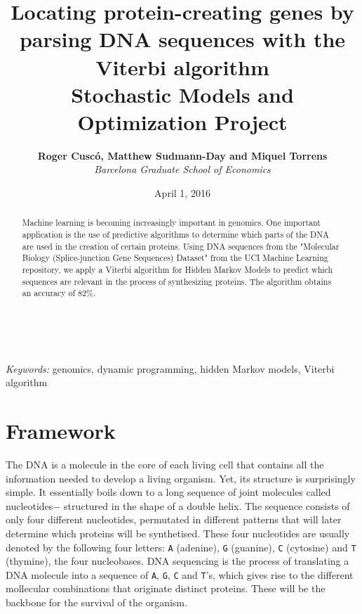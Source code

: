 \documentclass[a4paper, 11pt]{article} %
\title{\textbf{Locating protein-creating genes by parsing DNA sequences with the Viterbi algorithm}\\ %
\vspace{0.5cm}
{\Large Stochastic Models and Optimization Project}} %
\author{\textbf{Roger Cusc\'o, Matthew Sudmann-Day and Miquel Torrens} %
\vspace{0.1cm}
\\{{\large \textit{Barcelona Graduate School of Economics}}}} %
\date{\vspace{0.5cm} {\large April 1, 2016}} %
\makeatletter
\renewcommand{\maketitle}{ %
\begin{flushright} %
{\LARGE\@title} %

\vspace{50pt} %

{\large\@author} %
\\\@date %

\vspace{40pt} %
\end{flushright}
}
\makeatother
\begin{document}
\maketitle %



\begin{abstract}
Machine learning is becoming increasingly important in genomics. One important application is the use of predictive algorithms to determine which parts of the DNA are used in the creation of certain proteins. Using DNA sequences from the "Molecular Biology (Splice-junction Gene Sequences) Dataset" from the UCI Machine Learning repository, we apply a Viterbi algorithm for Hidden Markov Models to predict which sequences are relevant in the process of synthesizing proteins. The algorithm obtains an accuracy of 82\%.
\end{abstract}

\hspace*{3,6mm}\textit{Keywords:} genomics, dynamic programming, hidden Markov models, Viterbi algorithm %

\vspace{30pt} %


\section*{Framework}

The DNA is a molecule in the core of each living cell that contains all the information needed to develop a living organism. Yet, its structure is surprisingly simple. It essentially boils down to a long sequence of joint molecules \textendash called nucleotides$-$ structured in the shape of a double helix. The sequence consists of only four different nucleotides, permutated in different patterns that will later determine which proteins will be synthetised. These four nucleotides are usually denoted by the following four letters: \texttt{A} (adenine), \texttt{G} (guanine), \texttt{C} (cytosine) and \texttt{T} (thymine), the four nucleobases. DNA sequencing is the process of translating a DNA molecule into a sequence of \texttt{A}, \texttt{G}, \texttt{C} and \texttt{T}'s, which gives rise to the different mollecular combinations that originate distinct proteins. These will be the backbone for the survival of the organism.
\end{document}
